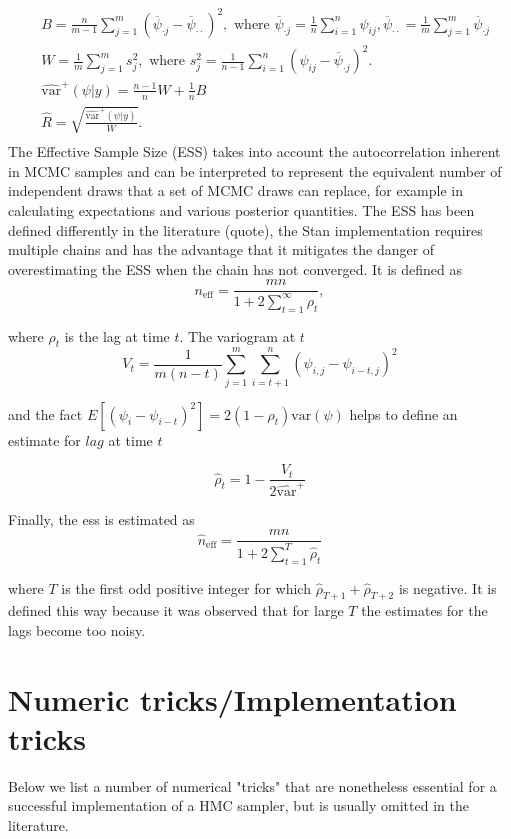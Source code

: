 \documentclass[12pt]{report}
\begin{document}
\begin{align*}
&B = \frac{n}{m-1} \sum_{j=1}^{m}(\overline{\psi}_{\cdot j} - \overline{\psi}_{\cdot \cdot})^2, \text{ where } 
\overline{\psi}_{\cdot j} = \frac{1}{n} \sum_{i=1}^n \psi_{ij} , \overline{\psi}_{\cdot \cdot} = \frac{1}{m} \sum_{j=1}^m \overline{\psi}_{\cdot j }
 \\
&W = \frac{1}{m} \sum_{j=1}^m s_j^2 , \text{ where }
s_j^2 = \frac{1}{n-1} \sum_{i=1}^n (\psi_{ij} - \overline{\psi}_{\cdot j } )^2.\\
& \hat{\text{var}}^+(\psi|y) = \frac{n-1}{n} W + \frac{1}{n} B \\
& \hat{R} = \sqrt{\frac{\hat{\text{var}}^+(\psi|y)}{W}}. \\
\end{align*}
The Effective Sample Size (ESS) takes into account the autocorrelation inherent in MCMC samples and can be interpreted to represent the equivalent number of independent draws that a set of MCMC draws can replace, for example in calculating expectations and various posterior quantities. The ESS has been defined  differently in the literature (quote), the Stan implementation requires multiple chains and has the advantage that it mitigates the danger of overestimating the ESS when the chain has not converged. It is defined as 
\[n_{\text{eff}}  = \frac{mn}{1 + 2 \sum_{t=1}^\infty \rho_t}, \]

where  $\rho_t$ is the lag at time $t$. The variogram at $t$ 
\[V_t = \frac{1}{m(n-t)} \sum_{j=1}^m \sum_{i=t+1}^n (\psi_{i,j} - \psi_{i-t,j})^2 \]

and the fact $E[(\psi_i - \psi_{i-t})^2] = 2(1-\rho_t)\text{var}(\psi)$ helps to define an estimate for $lag$ at time $t$ 

\[\hat{\rho}_t = 1 - \frac{V_t}{2 \hat{\text{var}}^+}\]

Finally, the ess is estimated as 
\[\hat{n}_{\text{eff}} = \frac{mn}{1 + 2 \sum_{t=1}^T \hat{\rho}_t} \]

where $T$ is the first odd positive integer for which $\hat{\rho}_{T+1} + \hat{\rho}_{T+2} $ is negative. It is defined this way because it was observed that for large $T$ the estimates for the lags become too noisy. 
 
\section{Numeric tricks/Implementation tricks}

Below we list a number of numerical "tricks" that are nonetheless essential for a successful implementation of a HMC sampler, but is usually omitted in the literature. 
\end{document}
